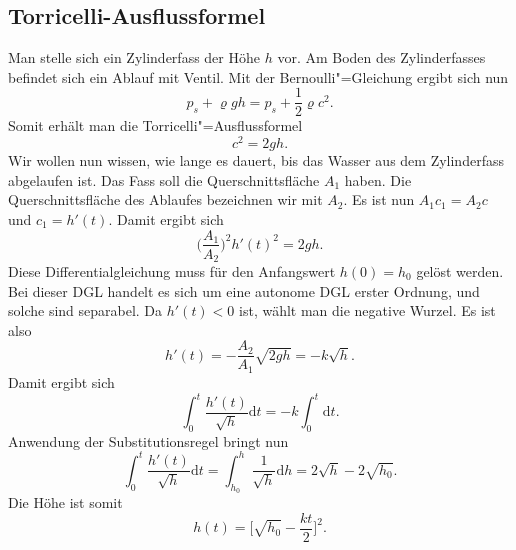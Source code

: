 \documentclass[a4paper,11pt,fleqn,twocolumn,twoside,dvipdfmx]{scrartcl}
\begin{document}
\subsection{Torricelli-Ausflussformel}
Man stelle sich ein Zylinderfass der Höhe $h$ vor. Am Boden des
Zylinderfasses befindet sich ein Ablauf mit Ventil. Mit der
Bernoulli"=Gleichung ergibt sich nun%
\[p_s+\varrho gh = p_s+\frac{1}{2}\varrho c^2.\]
Somit erhält man die Torricelli"=Ausflussformel%
\[c^2=2gh.\]
Wir wollen nun wissen, wie lange es dauert, bis das Wasser aus dem
Zylinderfass abgelaufen ist. Das Fass soll die Querschnittsfläche $A_1$
haben. Die Querschnittsfläche des Ablaufes bezeichnen wir mit $A_2$.
Es ist nun $A_1c_1=A_2c$ und $c_1=h'(t)$. Damit ergibt sich%
\[\Big(\frac{A_1}{A_2}\Big)^2 h'(t)^2 = 2gh.\]
Diese Differentialgleichung muss für den Anfangswert $h(0)=h_0$
gelöst werden. Bei dieser DGL handelt es sich um eine autonome
DGL erster Ordnung, und solche sind separabel. Da $h'(t)<0$ ist,
wählt man die negative Wurzel. Es ist also%
\[h'(t) = -\frac{A_2}{A_1} \sqrt{2gh} = -k\sqrt{h}.\]
Damit ergibt sich
\[\int_0^t \frac{h'(t)}{\sqrt{h}} \mathrm dt
= -k\int_0^t \mathrm dt.\]
Anwendung der Substitutionsregel bringt nun%
\[\int_0^t \frac{h'(t)}{\sqrt{h}}\mathrm dt
= \int_{h_0}^h \frac{1}{\sqrt{h}}\mathrm dh=2\sqrt{h}-2\sqrt{h_0}.\]
Die Höhe ist somit
\[h(t) = \bigg[\sqrt{h_0}-\frac{kt}{2}\bigg]^2.\]
\end{document}
